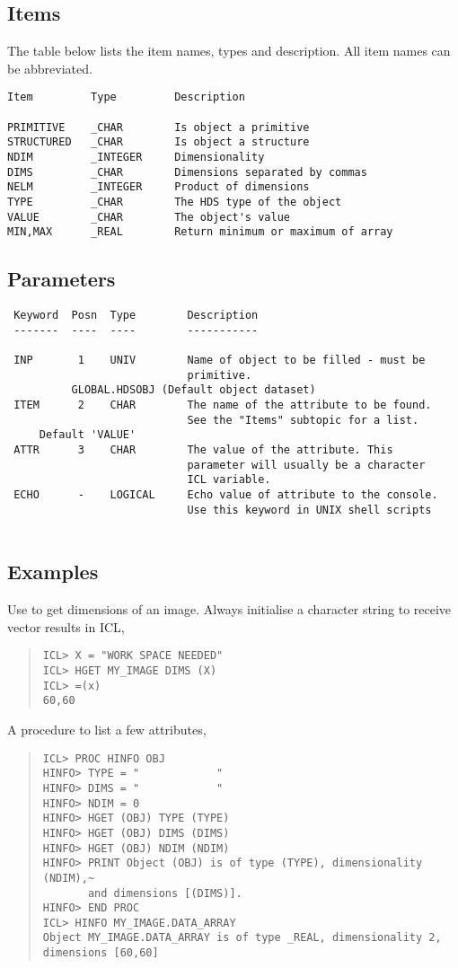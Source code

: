 \documentclass{book}
\renewcommand{\_}{{\tt\char'137}}     %
\begin{document}
\subsection{Items}
The table below lists the item names, types and description. All item
names can be abbreviated.
 
\begin{verbatim}
Item         Type         Description
 
PRIMITIVE    _CHAR        Is object a primitive
STRUCTURED   _CHAR        Is object a structure
NDIM         _INTEGER     Dimensionality
DIMS         _CHAR        Dimensions separated by commas
NELM         _INTEGER     Product of dimensions
TYPE         _CHAR        The HDS type of the object
VALUE        _CHAR        The object's value
MIN,MAX      _REAL        Return minimum or maximum of array
\end{verbatim}
\subsection{Parameters}
\begin{verbatim}
 Keyword  Posn  Type        Description
 -------  ----  ----        -----------
 
 INP       1    UNIV        Name of object to be filled - must be
                            primitive.
          GLOBAL.HDSOBJ (Default object dataset)
 ITEM      2    CHAR        The name of the attribute to be found.
                            See the "Items" subtopic for a list.
     Default 'VALUE'
 ATTR      3    CHAR        The value of the attribute. This
                            parameter will usually be a character
                            ICL variable.
 ECHO      -    LOGICAL     Echo value of attribute to the console.
                            Use this keyword in UNIX shell scripts
 
\end{verbatim}\subsection{Examples}
Use to get dimensions of an image. Always initialise a character
string to receive vector results in ICL,
\begin{quote}\begin{verbatim}
ICL> X = "WORK SPACE NEEDED"
ICL> HGET MY_IMAGE DIMS (X)
ICL> =(x)
60,60
\end{verbatim}\end{quote}
A procedure to list a few attributes,
\begin{quote}\begin{verbatim}
ICL> PROC HINFO OBJ
HINFO> TYPE = "            "
HINFO> DIMS = "            "
HINFO> NDIM = 0
HINFO> HGET (OBJ) TYPE (TYPE)
HINFO> HGET (OBJ) DIMS (DIMS)
HINFO> HGET (OBJ) NDIM (NDIM)
HINFO> PRINT Object (OBJ) is of type (TYPE), dimensionality (NDIM),~
       and dimensions [(DIMS)].
HINFO> END PROC
ICL> HINFO MY_IMAGE.DATA_ARRAY
Object MY_IMAGE.DATA_ARRAY is of type _REAL, dimensionality 2, dimensions [60,60]
\end{verbatim}\end{quote}
\end{document}
